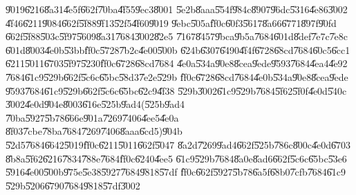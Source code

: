 \documentclass{article}
\begin{document}
\U{9019}\U{6216}\U{8a31}\U{4e5f}\U{662f}\U{70ba}\U{4f55}\U{9ec3}\U{8001}%
\U{5e2b}\U{8aaa}\U{554f}\U{984c}\U{8907}\U{96dc}\U{5316}\U{4e86}\U{3002}%
\U{4f46}\U{6211}\U{9084}\U{662f}\U{5f88}\U{9f13}\U{52f5}\U{4f60}\U{9019}%
\U{9ebc}\U{505a}\U{ff0c}\U{60f3}\U{5617}\U{8a66}\U{6771}\U{897f}\U{90fd}%
\U{662f}\U{5f88}\U{503c}\U{5f97}\U{5609}\U{8a31}\U{7684}\U{3002}\U{82e5}%
\U{7167}\U{8457}\U{9bca}\U{9b5a}\U{7684}\U{601d}\U{8def}\U{7e7c}\U{7e8c}%
\U{601d}\U{8003}\U{4e0b}\U{53bb}\U{ff0c}\U{5728}\U{7b2c}\U{4e00}\U{500b}%
\U{624b}\U{6307}\U{6490}\U{4f4f}\U{6728}\U{68cd}\U{7684}\U{60c5}\U{6cc1}%
\U{6211}\U{5011}\U{6703}\U{5f97}\U{5230}\U{ff0c}\U{6728}\U{68cd}\U{7684}%
\U{4e0a}\U{534a}\U{90e8}\U{8cea}\U{9ede}\U{9593}\U{7684}\U{4ea4}\U{4e92}%
\U{7684}\U{61c9}\U{529b}\U{662f}\U{5c6c}\U{65bc}\U{58d3}\U{7e2e}\U{529b}%
\U{ff0c}\U{6728}\U{68cd}\U{7684}\U{4e0b}\U{534a}\U{90e8}\U{8cea}\U{9ede}%
\U{9593}\U{7684}\U{61c9}\U{529b}\U{662f}\U{5c6c}\U{65bc}\U{62c9}\U{4f38}%
\U{529b}\U{3002}\U{61c9}\U{529b}\U{7684}\U{5f62}\U{5f0f}\U{4e0d}\U{540c}%
\U{3002}\U{4e0d}\U{904e}\U{8003}\U{616e}\U{525b}\U{9ad4}(\U{525b}\U{9ad4}%
\U{70ba}\U{5927}\U{5b78}\U{666e}\U{901a}\U{7269}\U{7406}\U{4ee5}\U{4e0a}%
\U{8f03}\U{7cbe}\U{78ba}\U{7684}\U{7269}\U{7406}\U{8aaa}\U{6cd5})\U{904b}%
\U{52d5}\U{7684}\U{6642}\U{5019}\U{ff0c}\U{6211}\U{5011}\U{662f}\U{5047}%
\U{8a2d}\U{7269}\U{9ad4}\U{662f}\U{525b}\U{786c}\U{800c}\U{4e0d}\U{6703}%
\U{8b8a}\U{5f62}\U{6216}\U{7834}\U{788e}\U{7684}\U{ff0c}\U{6240}\U{4ee5}%
\U{61c9}\U{529b}\U{7684}\U{8a0e}\U{8ad6}\U{662f}\U{5c6c}\U{65bc}\U{53e6}%
\U{5916}\U{4e00}\U{500b}\U{975e}\U{5e38}\U{5927}\U{7684}\U{9818}\U{57df}%
\U{ff0c}\U{662f}\U{5927}\U{5b78}\U{6a5f}\U{68b0}\U{7cfb}\U{7684}\U{61c9}%
\U{529b}\U{5206}\U{6790}\U{7684}\U{9818}\U{57df}\U{3002}

\bigskip
\end{document}
